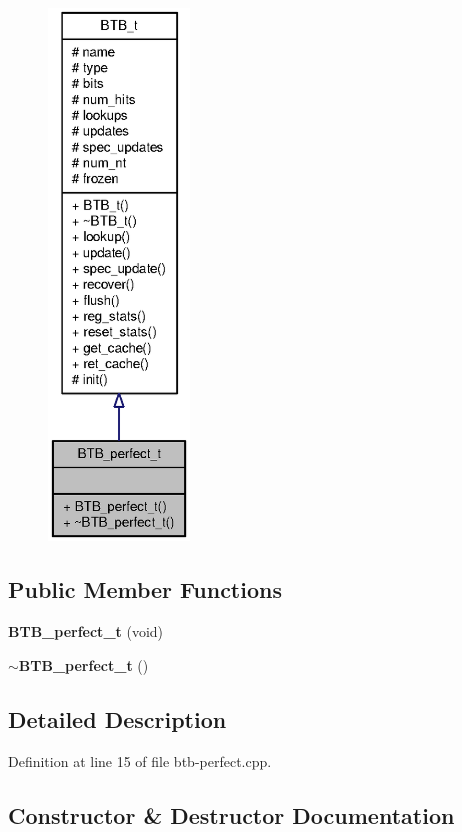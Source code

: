 \begin{figure}[H]
\begin{center}
\leavevmode
\includegraphics[height=400pt]{classBTB__perfect__t__coll__graph}
\end{center}
\end{figure}
\subsection*{Public Member Functions}
\begin{CompactItemize}
\item 
{\bf BTB\_\-perfect\_\-t} (void)
\item 
{\bf $\sim$BTB\_\-perfect\_\-t} ()
\end{CompactItemize}


\subsection{Detailed Description}


Definition at line 15 of file btb-perfect.cpp.

\subsection{Constructor \& Destructor Documentation}

